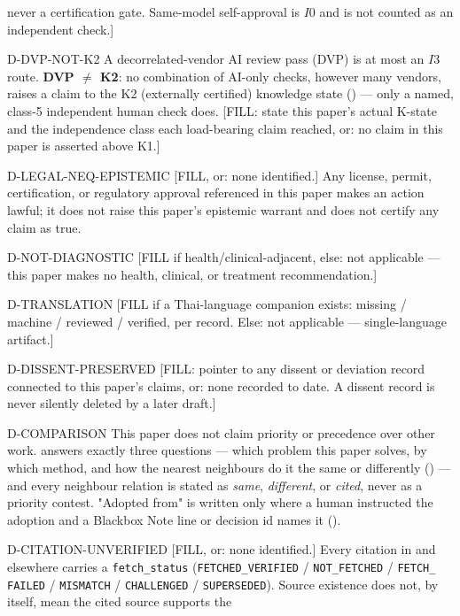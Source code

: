 \begin{disclaimers}
    never a certification gate. Same-model self-approval is \(I0\) and is not
    counted as an independent check.]
  \item[D-DVP-NOT-K2] A decorrelated-vendor AI review pass (DVP) is at most
    an \(I3\) route. \textbf{DVP $\neq$ K2}: no combination of AI-only
    checks, however many vendors, raises a claim to the K2 (externally
    certified) knowledge state () --- only a named, class-5
    independent human check does. [FILL: state this paper's actual K-state
    and the independence class each load-bearing claim reached, or: no
    claim in this paper is asserted above K1.]
  \item[D-LEGAL-NEQ-EPISTEMIC] [FILL, or: none identified.] Any license,
    permit, certification, or regulatory approval referenced in this paper
    makes an action lawful; it does not raise this paper's epistemic warrant
    and does not certify any claim as true.
  \item[D-NOT-DIAGNOSTIC] [FILL if health/clinical-adjacent, else: not
    applicable --- this paper makes no health, clinical, or treatment
    recommendation.]
  \item[D-TRANSLATION] [FILL if a Thai-language companion exists: missing /
    machine / reviewed / verified, per record. Else: not applicable ---
    single-language artifact.]
  \item[D-DISSENT-PRESERVED] [FILL: pointer to any dissent or deviation
    record connected to this paper's claims, or: none recorded to date. A
    dissent record is never silently deleted by a later draft.]
  \item[D-COMPARISON] This paper does not claim priority or precedence over
    other work.  answers exactly three questions --- which
    problem this paper solves, by which method, and how the nearest
    neighbours do it the same or differently () --- and
    every neighbour relation is stated as \emph{same}, \emph{different}, or
    \emph{cited}, never as a priority contest. "Adopted from" is written only
    where a human instructed the adoption and a Blackbox Note line or
    decision id names it ().
  \item[D-CITATION-UNVERIFIED] [FILL, or: none identified.] Every citation in
     and elsewhere carries a \texttt{fetch\_status}
    (\texttt{FETCHED\_VERIFIED} / \texttt{NOT\_FETCHED} / \texttt{FETCH\_
    FAILED} / \texttt{MISMATCH} / \texttt{CHALLENGED} / \texttt{SUPERSEDED}).
    Source existence does not, by itself, mean the cited source supports the

\end{disclaimers}
